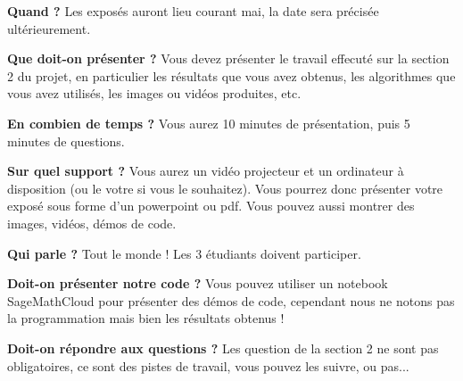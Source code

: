 \smallskip
\textbf{Quand ?} Les exposés auront lieu courant mai, la date sera précisée ultérieurement.

\smallskip
\textbf{Que doit-on présenter ?} Vous devez présenter le travail effecuté sur la section 2 du projet, en particulier les résultats que vous avez obtenus, les algorithmes que vous avez utilisés, les images ou vidéos produites, etc.

\smallskip
\textbf{En combien de temps ?} Vous aurez 10 minutes de présentation, puis 5 minutes de questions.

\smallskip
\textbf{Sur quel support ?} Vous aurez un vidéo projecteur et un ordinateur à disposition (ou le votre si vous le souhaitez). Vous pourrez donc présenter votre exposé sous forme d'un powerpoint ou pdf. Vous pouvez aussi montrer des images, vidéos, démos de code.

\smallskip
\textbf{Qui parle ?} Tout le monde ! Les 3 étudiants doivent participer.

\smallskip
\textbf{Doit-on présenter notre code ?} Vous pouvez utiliser un notebook SageMathCloud pour présenter des démos de code, cependant nous ne notons pas la programmation mais bien les résultats obtenus !

\smallskip
\textbf{Doit-on répondre aux questions ?} Les question de la section 2 ne sont pas obligatoires, ce sont des pistes de travail, vous pouvez les suivre, ou pas...
